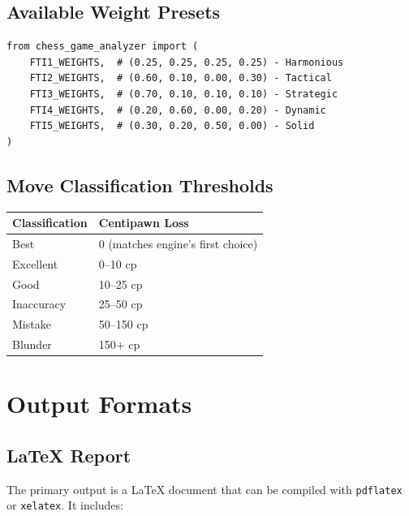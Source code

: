 \documentclass[12pt]{book}
\begin{document}
\subsection{Available Weight Presets}

\begin{verbatim}
from chess_game_analyzer import (
    FTI1_WEIGHTS,  # (0.25, 0.25, 0.25, 0.25) - Harmonious
    FTI2_WEIGHTS,  # (0.60, 0.10, 0.00, 0.30) - Tactical
    FTI3_WEIGHTS,  # (0.70, 0.10, 0.10, 0.10) - Strategic
    FTI4_WEIGHTS,  # (0.20, 0.60, 0.00, 0.20) - Dynamic
    FTI5_WEIGHTS,  # (0.30, 0.20, 0.50, 0.00) - Solid
)
\end{verbatim}

\subsection{Move Classification Thresholds}

\begin{center}
\begin{tabular}{ll}
\toprule
\textbf{Classification} & \textbf{Centipawn Loss} \\
\midrule
Best & 0 (matches engine's first choice) \\
Excellent & 0--10 cp \\
Good & 10--25 cp \\
Inaccuracy & 25--50 cp \\
Mistake & 50--150 cp \\
Blunder & 150+ cp \\
\bottomrule
\end{tabular}
\end{center}

\section{Output Formats}

\subsection{\LaTeX{} Report}

The primary output is a \LaTeX{} document that can be compiled with \texttt{pdflatex} or \texttt{xelatex}. It includes:
\end{document}
